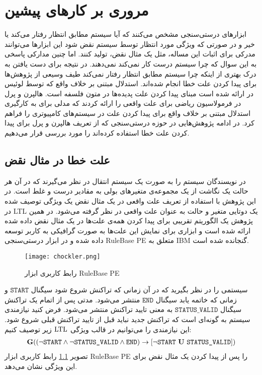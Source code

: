 \chapter{مروری بر کار‌های پیشین}
ابزار‌های درستی‌سنجی مشخص می‌کنند که آیا سیستم مطابق انتظار رفتار می‌کند یا خیر و در صورتی که ویژگی مورد انتظار توسط سیستم نقض شود این ابزارها می‌توانند مدرکی برای اثبات این مساله، مثل یک مثال نقض، تولید کنند.
اما چنین مدارکی پاسخی به این سوال که چرا سیستم درست کار نمی‌کند نمی‌دهند. 
در نتیجه برای دست یافتن به درک بهتری از اینکه چرا سیستم مطابق انتظار رفتار نمی‌کند طیف وسیعی از پژوهش‌ها برای  پیدا کردن علت خطا انجام شده‌اند.
استدلال مبتنی بر خلاف واقع که توسط لوئیس در 
\cite{lewis1973counterfactuals}
ارائه شده است مبنای پیدا کردن علت پدیده‌ها در متون فلسفه است.
هالپرن و پرل در 
\cite{hp}
فرمولاسیون ریاضی برای علت واقعی را ارائه کردند که مدلی برای به کارگیری استدلال مبتنی بر خلاف واقع برای پیدا کردن علت در سیستم‌های کامپیوتری را فراهم کرد.
در ادامه پژوهش‌هایی در حوزه درستی‌سنجی که از تعریف هالپرن و پرل برای پیدا کردن علت خطا استفاده کرده‌اند را مورد بررسی قرار می‌دهیم.


\section{علت خطا در مثال نقض}
در
\cite{chockler}
نویسندگان سیستم را به صورت یک سیستم انتقال
در نظر می‌گیرند که در آن هر حالت یک نگاشت از یک مجموعه‌ی متغیر‌های بولی به مقادیر درست و غلط است.
در این پژوهش با استفاده از تعریف علت واقعی در یک مثال نقض یک ویژگی توصیف شده در
LTL
یک دوتایی‌ متغیر و حالت به عنوان علت واقعی در نظر گرفته می‌شود.
در همین پژوهش یک الگوریتم تقریبی برای پیدا کردن همه‌ی علت‌ها در یک مثال نقض داده شده ارائه شده است و ابزاری برای نمایش این علت‌ها به صورت گرافیکی به کاربر توسعه داده شده و در ابزار درستی‌سنجی
RuleBase PE
متعلق به
IBM
گنجانده شده است.
\begin{figure}
    \centering
    \texttt{[image: chockler.png]}
    \caption{رابط کاربری ابزار
        RuleBase PE
    }
    \label{fig:rulebase}
\end{figure}
سیستمی را در نظر بگیرید که در آن زمانی که تراکنش شروع شود سیگنال 
$\texttt{START}$
و زمانی که خاتمه یابد سیگنال 
$\texttt{END}$
منتشر می‌شود.
مدتی پس از اتمام یک تراکنش سیگنال 
$\texttt{STATUS\_VALID}$
به معنی تایید تراکنش منتشر می‌شود.
فرض کنید نیازمندی سیستم به گونه‌ای است که تراکنش جدید نباید قبل از تایید تراکنش قبلی شروع شود. 
این نیازمندی را می‌توانیم در قالب ویژگی 
$\mathrm{LTL}$
زیر توصیف کنیم:
\begin{align*}
    \boldsymbol{\mr{G}}((\neg \texttt{START} \wedge \neg \texttt{STATUS\_VALID} \wedge \texttt{END}) 
    \ra [\neg \texttt{START}\ \boldsymbol{\mr{U}}\ \texttt{STATUS\_VALID}])
\end{align*}
تصویر
\ref{fig:rulebase}
رابط کاربری ابزار 
RuleBase PE
را پس از پیدا کردن یک مثال نقض برای این ویژگی نشان می‌دهد.

